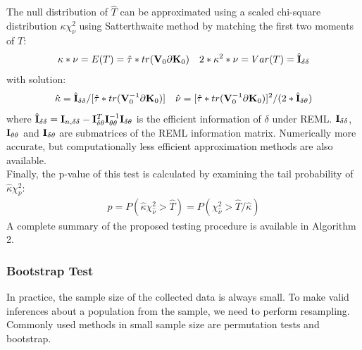 \documentclass[11pt]{article}
\begin{document}
The null distribution of $\hat{T}$ can be approximated using a scaled chi-square distribution $\kappa \chi_\nu^2$ using Satterthwaite method by matching the first two moments of $T$:
\begin{align*}
\kappa * \nu=E(T)=\hat{\tau} * tr({\bf V}_0\partial {\bf K}_0)
 \quad 2*\kappa^2*\nu=Var(T)=\hat{{\bf I}}_{\delta\delta}
\end{align*}
with solution:
\begin{align*}
\hat{\kappa}=\hat{{\bf I}}_{\delta\delta}/[\hat{\tau}*tr({\bf V}_0^{-1}\partial {\bf K}_0)] \quad \hat{\nu}=[\hat{\tau}*tr({\bf V}_0^{-1}\partial {\bf K}_0)]^2/(2*\hat{{\bf I}}_{\delta\theta})
\end{align*}
where $\hat{{\bf I}}_{\delta\delta}={\bf I}_{n, \delta\delta}-{\bf I}_{\delta\theta}^T{\bf I}_{\theta\theta}^{-1}{\bf I}_{\delta\theta}$ is the efficient information of $\delta$ under REML. ${\bf I}_{\delta\delta}$, ${\bf I}_{\theta\theta}$ and ${\bf I}_{\delta\theta}$ are submatrices of the REML information matrix. 
Numerically more accurate, but computationally less efficient approximation methods are also available.\\
Finally, the p-value of this test is calculated by examining the tail probability of $\hat{\kappa} \chi_{\hat{\nu}}^2$:
\begin{align*}
p=P(\hat{\kappa} \chi_{\hat{\nu}}^2>\hat{T})=P(\chi_{\hat{\nu}}^2>\hat{T}/\hat{\kappa})
\end{align*}
A complete summary of the proposed testing procedure is available in Algorithm 2.

\subsubsection{{Bootstrap Test}}
In practice, the sample size of the collected data is always small. To make valid inferences about a population from the sample, we need to perform resampling. Commonly used methods in small sample size are permutation tests and bootstrap.\\
\end{document}
